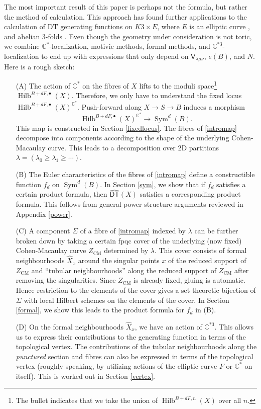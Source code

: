 \documentclass{amsart}
\theoremstyle{definition}
\newcommand{\CC} {\mathbb{C}}          %
\newcommand{\sfV}{\mathsf{V}}
\newcommand{\Sym}{\operatorname{Sym}}
\newcommand{\Hilb}{\operatorname{Hilb}}
\newcommand{\DT}{\mathsf{DT}}
\newcommand{\CM}{\operatorname{CM}}
\newcommand{\DThat}{\widehat{\DT}}
\newcommand{\Xhat}{\widehat{X}}
\begin{document}
The most important result of this paper is perhaps not the formula, but rather the method of calculation. This approach has found further applications to the calculation of DT generating functions on $K3 \times E$, where $E$ is an elliptic curve \cite{Bry}, and abelian 3-folds \cite{BOPY}. Even though the geometry under consideration is not toric, we combine $\CC^*$-localization, motivic methods, formal methods, and $\CC^{*3}$-localization to end up with expressions that only depend on $\sfV_{\lambda\mu\nu}$, $e(B)$, and $N$. Here is a rough sketch:
\begin{enumerate}
\item[(A)] The action of $\CC^*$ on the fibres of $X$ lifts to the
moduli space\footnote{The bullet indicates that we take the union of
$\Hilb^{B+dF,n}(X)$ over all $n$.}
$\Hilb^{B+dF,\bullet}(X)$. Therefore, we only have to understand the
fixed locus $\Hilb^{B+dF,\bullet}(X)^{\CC^*}$. Push-forward along $X
\rightarrow S \rightarrow B$ induces a morphism
\begin{equation} \label{intromap}
\Hilb^{B+dF,\bullet}(X)^{\CC^*} \rightarrow \Sym^d(B).
\end{equation}
This map is constructed in Section \ref{fixedlocus}. The fibres of
\eqref{intromap} decompose into components according to the shape of
the underlying Cohen-Macaulay curve. This leads to a decomposition
over 2D partitions $\lambda = (\lambda_0 \geq \lambda_1 \geq \cdots)$.
\item[(B)] The Euler characteristics of the fibres of \eqref{intromap}
define a constructible function $f_d$ on $\Sym^d(B)$. In Section
\ref{sym}, we show that if $f_d$ satisfies a certain product formula,
then $\DThat (X)$ satisfies a corresponding product formula. This
follows from general power structure arguments reviewed in Appendix
\ref{power}.
\item[(C)] A component $\Sigma$ of a fibre of \eqref{intromap} indexed
by $\lambda$ can be further broken down by taking a certain fpqc cover
of the underlying (now fixed) Cohen-Macaulay curve $Z_{\CM}$
determined by $\lambda$. This cover consists of formal neighbourhoods
$\Xhat _x$ around the singular points $x$ of the reduced support of
$Z_{\CM}$ and ``tubular neighbourhoods'' along the reduced support of
$Z_{\CM}$ after removing the singularities. Since $Z_{\CM}$ is already
fixed, gluing is automatic. Hence restriction to the elements of the
cover gives a set theoretic bijection of $\Sigma$ with local Hilbert
schemes on the elements of the cover. In Section \ref{formal}, we show
this leads to the product formula for $f_d$ in (B).
\item[(D)] On the formal neighbourhoods $\Xhat _x$, we have an action
of $\CC^{*3}$. This allows us to express their contributions to the
generating function in terms of the topological vertex. The
contributions of the tubular neighbourhoods along the \emph{punctured}
section and fibres can also be expressed in terms of the topological
vertex (roughly speaking, by utilizing actions of the elliptic curve
$F$ or $\CC^*$ on itself). This is worked out in Section \ref{vertex}.
\end{enumerate}
\end{document}

